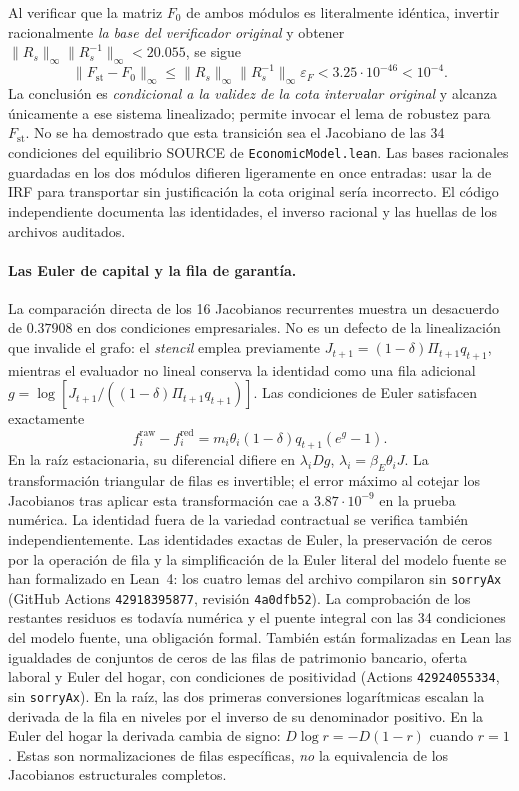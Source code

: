 Al verificar que la matriz $F_0$ de ambos módulos es
literalmente idéntica, invertir racionalmente \emph{la base
del verificador original} y obtener
$\|R_s\|_\infty\|R_s^{-1}\|_\infty<20.055$, se sigue
\[
 \|F_{\mathrm{st}}-F_0\|_\infty
 \le \|R_s\|_\infty\|R_s^{-1}\|_\infty\varepsilon_F
 <3.25\cdot10^{-46}<10^{-4}.
\]
La conclusión es \emph{condicional a la validez de la cota
intervalar original} y alcanza únicamente a ese sistema
linealizado; permite invocar el lema de robustez
para $F_{\mathrm{st}}$. No se ha demostrado que esta
transición sea el Jacobiano de las 34 condiciones del
equilibrio SOURCE de \texttt{EconomicModel.lean}.
Las bases racionales guardadas en los dos módulos difieren
ligeramente en once entradas: usar la de IRF para transportar
sin justificación la cota original sería incorrecto.
El código independiente
documenta las identidades, el inverso racional y las
huellas de los archivos auditados.

\paragraph{Las Euler de capital y la fila de garantía.}
La comparación directa de los 16 Jacobianos recurrentes muestra
un desacuerdo de $0.37908$ en dos condiciones empresariales.
No es un defecto de la linealización que invalide el grafo:
el \emph{stencil} emplea previamente
$J_{t+1}=(1-\delta)\Pi_{t+1}q_{t+1}$,
mientras el evaluador no lineal conserva la identidad como
una fila adicional $g=\log[J_{t+1}/((1-\delta)
\Pi_{t+1}q_{t+1})]$. Las condiciones de Euler satisfacen
exactamente
\[
 f_i^{\mathrm{raw}}-f_i^{\mathrm{red}}
 =m_i\theta_i(1-\delta)q_{t+1}(e^g-1).
\]
En la raíz estacionaria, su diferencial difiere en
$\lambda_iDg$, $\lambda_i=\beta_E\theta_i J$.
La transformación triangular de filas es invertible;
el error máximo al cotejar los Jacobianos tras aplicar
esta transformación cae a $3.87\cdot10^{-9}$
en la prueba numérica. La identidad fuera de la
variedad contractual se verifica también independientemente.
Las identidades exactas de Euler, la preservación de ceros
por la operación de fila y la simplificación de la Euler
literal del modelo fuente se han formalizado en Lean~4:
los cuatro lemas del archivo
compilaron sin \texttt{sorryAx} (GitHub Actions
\texttt{42918395877}, revisión \texttt{4a0dfb52}).
La comprobación de los restantes residuos es todavía
numérica y el puente integral con las 34 condiciones del
modelo fuente, una obligación formal. También están
formalizadas en Lean las igualdades de conjuntos de
ceros de las filas de patrimonio bancario, oferta laboral
y Euler del hogar, con condiciones de positividad
(Actions \texttt{42924055334}, sin \texttt{sorryAx}).
En la raíz, las dos primeras conversiones logarítmicas
escalan la derivada de la fila en niveles por el inverso
de su denominador positivo. En la Euler del hogar la
derivada cambia de signo:
$D\log r=-D(1-r)$ cuando $r=1$.
Estas son normalizaciones de filas específicas,
\emph{no} la equivalencia de los Jacobianos estructurales
completos.

